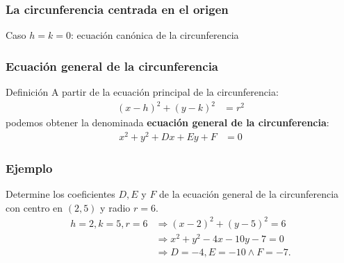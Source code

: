 \documentclass[12pt,spanish,x11names]{beamer}
\begin{document}
\begin{frame}
  \frametitle{La circunferencia centrada en el origen}
  \begin{block}{Caso $h=k=0$: ecuación canónica de la circunferencia}
  \end{block}
\end{frame}
\begin{frame}
  \frametitle{Ecuación general de la circunferencia}
  \begin{block}{Definición}
    A partir de la ecuación principal de la circunferencia:
    \begin{align*}
      (x-h)^2+(y-k)^2&=r^2
    \end{align*}
    podemos obtener la denominada \textbf{ecuación general de la
      circunferencia}:
    \begin{align*}
      x^2+y^2+Dx+Ey+F&=0
    \end{align*}
  \end{block}
\end{frame}
\begin{frame}
  \frametitle{Ejemplo}
  \begin{exampleblock}{Determine los coeficientes $D,E$ y $F$ de la ecuación general de la
      circunferencia con centro en $(2,5)$ y radio $r=6$.}
    \begin{align*}
      h=2,k=5,r=6&\Rightarrow (x-2)^2+(y-5)^2=6\\
                 &\Rightarrow x^2+y^2-4x-10y-7=0\\
                 &\Rightarrow D=-4,E=-10\wedge F=-7.
    \end{align*}
  \end{exampleblock}
\end{frame}
\end{document}
